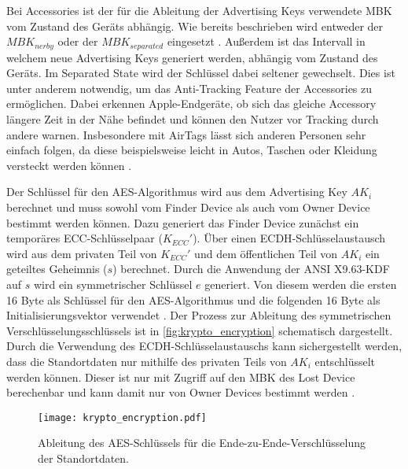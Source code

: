 Bei Accessories ist der für die Ableitung der Advertising Keys verwendete \ac{MBK} vom Zustand des Geräts abhängig.
Wie bereits beschrieben wird entweder der $MBK_{nerby}$ oder der  $MBK_{separated}$ eingesetzt \cite{Apple_FindMySpec}.
Außerdem ist das Intervall in welchem neue Advertising Keys generiert werden, abhängig vom Zustand des Geräts.
Im Separated State wird der Schlüssel dabei seltener gewechselt.
Dies ist unter anderem notwendig, um das Anti-Tracking Feature der Accessories zu ermöglichen.
Dabei erkennen Apple-Endgeräte, ob sich das gleiche Accessory längere Zeit in der Nähe befindet und können den Nutzer vor Tracking durch andere warnen.
Insbesondere mit AirTags lässt sich anderen Personen sehr einfach folgen, da diese beispielsweise leicht in Autos, Taschen oder Kleidung versteckt werden können \cite{Heinrich_AirGuard}.


Der Schlüssel für den \ac{AES}-Algorithmus wird aus dem Advertising Key $AK_i$ berechnet und muss sowohl vom Finder Device als auch vom Owner Device bestimmt werden können.
Dazu generiert das Finder Device zunächst ein temporäres \ac{ECC}-Schlüsselpaar ($K_{ECC}'$).
Über einen \ac{ECDH}-Schlüsselaustausch wird aus dem privaten Teil von $K_{ECC}'$ und dem öffentlichen Teil von $AK_i$ ein geteiltes Geheimnis ($s$) berechnet.
Durch die Anwendung der ANSI X9.63-\ac{KDF} auf $s$ wird ein symmetrischer Schlüssel $e$ generiert.
Von diesem werden die ersten 16 Byte als Schlüssel für den \ac{AES}-Algorithmus und die folgenden 16 Byte als Initialisierungsvektor verwendet \cite{Heinrich_FindMy}.
Der Prozess zur Ableitung des symmetrischen Verschlüsselungsschlüssels ist in \autoref{fig:krypto_encryption} schematisch dargestellt.
Durch die Verwendung des \ac{ECDH}-Schlüsselaustauschs kann sichergestellt werden, dass die Standortdaten nur mithilfe des privaten Teils von $AK_i$ entschlüsselt werden können.
Dieser ist nur mit Zugriff auf den \ac{MBK} des Lost Device berechenbar und kann damit nur von Owner Devices bestimmt werden \cite{Heinrich_FindMy}.

\begin{figure}[ht]
    \centering
    \texttt{[image: krypto\_encryption.pdf]}
    \caption{Ableitung des \ac{AES}-Schlüssels für die Ende-zu-Ende-Verschlüsselung der Standortdaten.}
    \label{fig:krypto_encryption}
\end{figure}

